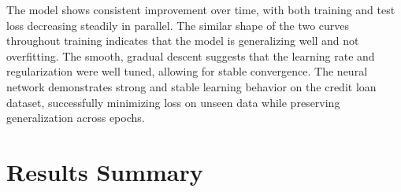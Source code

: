 \documentclass[letterpaper]{article}
\begin{document}
The model shows consistent improvement over time, with both training and test loss decreasing steadily in parallel. The similar shape of the two curves throughout training indicates that the model is generalizing well and not overfitting. The smooth, gradual descent suggests that the learning rate and regularization were well tuned, allowing for stable convergence. The neural network demonstrates strong and stable learning behavior on the credit loan dataset, successfully minimizing loss on unseen data while preserving generalization across epochs.


\section{Results Summary}
\end{document}
